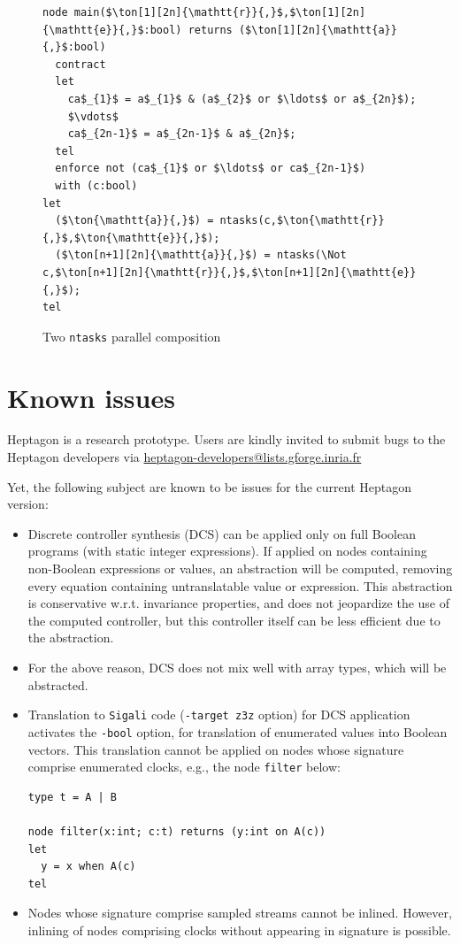 \documentclass[a4paper]{article}
\begin{document}
\begin{figure}[htb]
  \centering
\begin{lstlisting}
node main($\ton[1][2n]{\mathtt{r}}{,}$,$\ton[1][2n]{\mathtt{e}}{,}$:bool) returns ($\ton[1][2n]{\mathtt{a}}{,}$:bool)
  contract
  let
    ca$_{1}$ = a$_{1}$ & (a$_{2}$ or $\ldots$ or a$_{2n}$);
    $\vdots$
    ca$_{2n-1}$ = a$_{2n-1}$ & a$_{2n}$;
  tel
  enforce not (ca$_{1}$ or $\ldots$ or ca$_{2n-1}$)
  with (c:bool)
let
  ($\ton{\mathtt{a}}{,}$) = ntasks(c,$\ton{\mathtt{r}}{,}$,$\ton{\mathtt{e}}{,}$); 
  ($\ton[n+1][2n]{\mathtt{a}}{,}$) = ntasks(\Not c,$\ton[n+1][2n]{\mathtt{r}}{,}$,$\ton[n+1][2n]{\mathtt{e}}{,}$); 
tel
\end{lstlisting}
  \caption{Two \texttt{ntasks} parallel composition}
  \label{fig:ntasks-compos}
\end{figure}

\section{Known issues}
\label{sec:known-issues}

Heptagon is a research prototype. Users are kindly invited to submit bugs to the
Heptagon developers via \url{heptagon-developers@lists.gforge.inria.fr}

Yet, the following subject are known to be issues for the current Heptagon
version:
\begin{itemize}
\item Discrete controller synthesis (DCS) can be applied only on full Boolean
  programs (with static integer expressions). If applied on nodes containing
  non-Boolean expressions or values, an abstraction will be computed, removing
  every equation containing untranslatable value or expression. This abstraction
  is conservative w.r.t. invariance properties, and does not jeopardize the use
  of the computed controller, but this controller itself can be less efficient
  due to the abstraction.
\item For the above reason, DCS does not mix well with array types, which will
  be abstracted.
\item Translation to \texttt{Sigali} code (\texttt{-target z3z} option) for DCS
  application activates the \texttt{-bool} option, for translation of enumerated
  values into Boolean vectors. This translation cannot be applied on nodes whose
  signature comprise enumerated clocks, e.g., the node \lstinline{filter} below:

\begin{lstlisting}
type t = A | B

node filter(x:int; c:t) returns (y:int on A(c))
let
  y = x when A(c)
tel
\end{lstlisting}

\item Nodes whose signature comprise sampled streams cannot be inlined. However,
  inlining of nodes comprising clocks without appearing in signature is
  possible.
\end{itemize}
\end{document}
